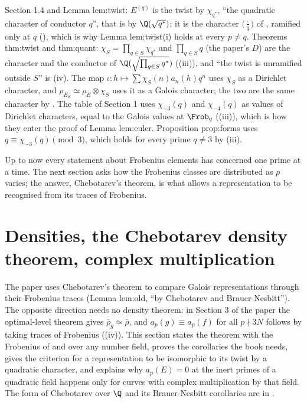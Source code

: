 \begin{paperlink}\label{pl:ant:twist}
Section 1.4 and Lemma lem:twist: $E^{(q)}$ is the twist by $\chi_{q^*}$, ``the quadratic character of conductor $q$'', that is by $\Q(\sqrt{q^*})$; it is the
character $\bigl(\frac\cdot q\bigr)$ of , ramified only at $q$ (), which is why Lemma lem:twist(i) holds at every
$p\ne q$. Theorems thm:twist and thm:quant: $\chi_S=\prod_{q\in S}\chi_{q^*}$ and $\prod_{q\in S}q$ (the paper's $D$) are the character and the conductor of
$\Q(\sqrt{\prod_{q\in S}q^*})$ ((iii)), and ``the twist is unramified outside $S$'' is (iv). The map
$\iota\colon h\mapsto\sum\chi_S(n)a_n(h)q^n$ uses $\chi_S$ as a Dirichlet character, and $\rho_{E_S}\simeq\rho_E\otimes\chi_S$ uses it as a Galois character; the
two are the same character by . The table of Section 1 uses $\chi_{-3}(q)$ and $\chi_{-4}(q)$ as values of Dirichlet characters,
equal to the Galois values at $\Frob_q$ ((iii)), which is how they enter the proof of Lemma lem:euler. Proposition prop:forms uses
$q\equiv\chi_{-3}(q)\pmod3$, which holds for every prime $q\ne3$ by (iii).
\end{paperlink}

Up to now every statement about Frobenius elements has concerned one prime at a time. The next section asks how the Frobenius classes are distributed as $p$
varies; the answer, Chebotarev's theorem, is what allows a representation to be recognised from its traces of Frobenius.

\section[Densities, Chebotarev, complex multiplication]{Densities, the Chebotarev density theorem, complex multiplication}\label{sec:ant:chebotarev}

The paper uses Chebotarev's theorem to compare Galois representations through their Frobenius traces (Lemma lem:old, ``by Chebotarev and
Brauer-Nesbitt''). The opposite direction needs no density theorem: in Section 3 of the paper the optimal-level theorem gives $\bar\rho_g\simeq\bar\rho$, and
$a_p(g)\equiv a_p(f)$ for all $p\nmid3N$ follows by taking traces of Frobenius ((iv)). This section states the theorem with the Frobenius of
 and over any number field, proves the corollaries the book needs, gives the criterion for a representation to be isomorphic to its
twist by a quadratic character, and explains why $a_p(E)=0$ at the inert primes of a quadratic field
happens only for curves with complex multiplication by that field. The form of Chebotarev over $\Q$ and its Brauer-Nesbitt corollaries are in
.


